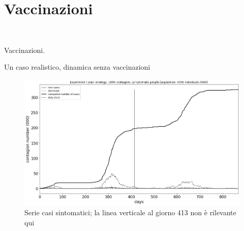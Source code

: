 \documentclass[]{beamer}
\begin{document}
\section{Vaccinazioni}


\begin{frame}{~}

\huge Vaccinazioni.

\end{frame}

\begin{frame}{Un caso realistico, dinamica senza vaccinazioni}


\begin{figure}[H]
\center
\includegraphics[scale=0.16]{Experiment_I_base_symptomatic_series.png}

\caption{Serie casi sintomatici; la linea verticale al giorno 413 non \`{e} rilevante qui}
\label{Experiment_I_plainSymptomaticSeries}
\end{figure}


\end{frame}
\end{document}
